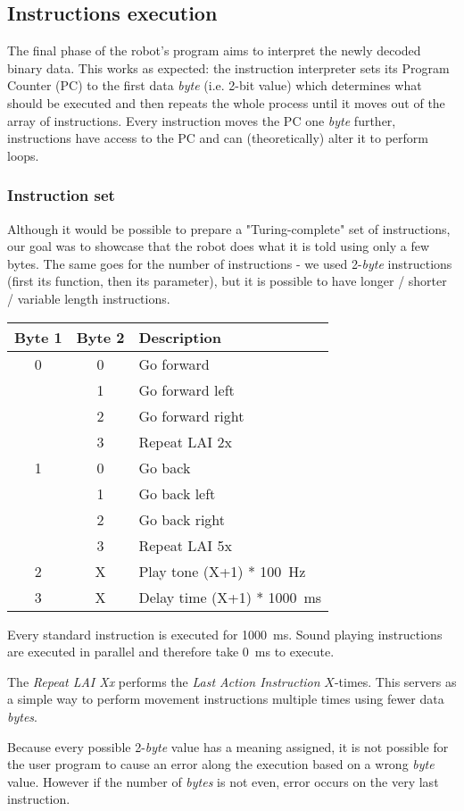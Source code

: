 \subsection{Instructions execution}
The final phase of the robot's program aims to interpret the newly decoded
binary data. This works as expected: the instruction interpreter sets its
Program Counter (PC) to the first data \textit{byte} (i.e. 2-bit value)
which determines what should be executed and then repeats the whole
process until it moves out of the array of instructions. Every
instruction moves the PC one \textit{byte} further, instructions have
access to the PC and can (theoretically) alter it to perform loops.

\subsubsection{Instruction set}
Although it would be possible to prepare a "Turing-complete" set
of instructions, our goal was to showcase that the robot does what it is
told using only a few bytes.
The same goes for the number of instructions - we used 2-\textit{byte}
instructions (first its function, then its parameter), but it is
possible to have longer / shorter / variable length instructions.

\begin{center}
\begin{tabular}{|c|c||l|}
\hline
\textbf{Byte 1}   &   \textbf{Byte 2}   &   \textbf{Description}\\
\hline
\hline
    0   &   0       &   Go forward\\
        &   1       &   Go forward left\\
        &   2       &   Go forward right\\
        &   3       &   Repeat LAI 2x\\
\hline
    1   &   0       &   Go back\\
        &   1       &   Go back left\\
        &   2       &   Go back right\\
        &   3       &   Repeat LAI 5x\\
\hline
    2   &   X       &   Play tone (X+1) * 100~Hz\\
\hline
    3   &   X       &   Delay time (X+1) * 1000~ms\\
 \hline
 \end{tabular}
\end{center}

Every standard instruction is executed for 1000~ms. Sound playing
instructions are executed in parallel and therefore take 0~ms to execute.

The \textit{Repeat LAI Xx} performs the \textit{Last Action Instruction}
$X$-times. This servers as a simple way to perform movement instructions
multiple times using fewer data \textit{bytes}.

Because every possible 2-\textit{byte} value has a meaning assigned,
it is not possible for the user program to cause an error along the
execution based on a wrong \textit{byte} value. However if the number
of \textit{bytes} is not even, error occurs on the very last instruction.


